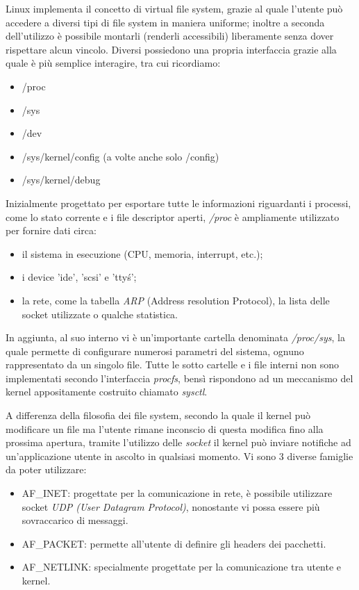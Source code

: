 Linux implementa il concetto di virtual file system, grazie al quale l'utente può accedere a diversi tipi di file system in maniera uniforme; inoltre a seconda dell'utilizzo è possibile montarli (renderli accessibili) liberamente senza dover rispettare alcun vincolo.
Diversi possiedono una propria interfaccia grazie alla quale è più semplice interagire, tra cui ricordiamo:

\begin{itemize}
\item /proc
\item /sys
\item /dev
\item /sys/kernel/config (a volte anche solo /config)
\item /sys/kernel/debug
\end{itemize}

Inizialmente progettato per esportare tutte le informazioni riguardanti i processi, come lo stato corrente e i file descriptor aperti, \emph{/proc} è ampliamente utilizzato per fornire dati circa:

\begin{itemize}
\item il sistema in esecuzione (CPU, memoria, interrupt, etc.);
\item i device 'ide', 'scsi' e 'tty\'s';
\item la rete, come la tabella \emph{ARP} (Address resolution Protocol), la lista delle socket utilizzate o qualche statistica.
\end{itemize}

In aggiunta, al suo interno vi è un'importante cartella denominata \emph{/proc/sys}, la quale permette di configurare numerosi parametri del sistema, ognuno rappresentato da un singolo file. Tutte le sotto cartelle e i file interni non sono implementati secondo l'interfaccia \emph{procfs}, bensì rispondono ad un meccanismo del kernel appositamente costruito chiamato \emph{sysctl}.

A differenza della filosofia dei file system, secondo la quale il kernel può modificare un file ma l'utente rimane inconscio di questa modifica fino alla prossima apertura, tramite l'utilizzo delle \emph{socket} il kernel può inviare notifiche ad un'applicazione utente in ascolto in qualsiasi momento. Vi sono 3 diverse famiglie da poter utilizzare:

\begin{itemize}
\item AF\_INET: progettate per la comunicazione in rete, è possibile utilizzare socket \emph{UDP (User Datagram Protocol)}, nonostante vi possa essere più sovraccarico di messaggi.
\item AF\_PACKET: permette all'utente di definire gli headers dei pacchetti.
\item AF\_NETLINK: specialmente progettate per la comunicazione tra utente e kernel.
\end{itemize}

